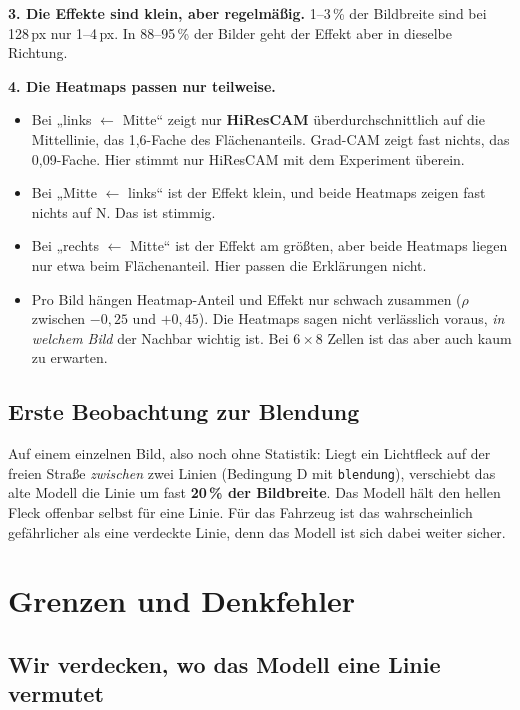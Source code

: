 \documentclass[11pt,a4paper]{article}
\newcommand{\code}[1]{\texttt{#1}}
\begin{document}
\textbf{3. Die Effekte sind klein, aber regelmäßig.} 1--3\,\% der Bildbreite sind bei 128\,px
nur 1--4\,px. In 88--95\,\% der Bilder geht der Effekt aber in dieselbe Richtung.

\textbf{4. Die Heatmaps passen nur teilweise.}
\begin{itemize}
  \item Bei „links $\leftarrow$ Mitte“ zeigt nur \textbf{HiResCAM} überdurchschnittlich auf die
        Mittellinie, das 1,6-Fache des Flächenanteils. Grad-CAM zeigt fast nichts, das
        0,09-Fache. Hier stimmt nur HiResCAM mit dem Experiment überein.
  \item Bei „Mitte $\leftarrow$ links“ ist der Effekt klein, und beide Heatmaps zeigen fast nichts
        auf N. Das ist stimmig.
  \item Bei „rechts $\leftarrow$ Mitte“ ist der Effekt am größten, aber beide Heatmaps liegen nur
        etwa beim Flächenanteil. Hier passen die Erklärungen nicht.
  \item Pro Bild hängen Heatmap-Anteil und Effekt nur schwach zusammen ($\rho$ zwischen $-0{,}25$
        und $+0{,}45$). Die Heatmaps sagen nicht verlässlich voraus, \emph{in welchem Bild} der
        Nachbar wichtig ist. Bei $6\times8$ Zellen ist das aber auch kaum zu erwarten.
\end{itemize}



\subsection{Erste Beobachtung zur Blendung}

Auf einem einzelnen Bild, also noch ohne Statistik: Liegt ein Lichtfleck auf der freien Straße
\emph{zwischen} zwei Linien (Bedingung D mit \code{blendung}), verschiebt das alte Modell die
Linie um fast \textbf{20\,\% der Bildbreite}. Das Modell hält den hellen Fleck offenbar selbst
für eine Linie. Für das Fahrzeug ist das wahrscheinlich gefährlicher als eine verdeckte Linie,
denn das Modell ist sich dabei weiter sicher.

\section{Grenzen und Denkfehler}

\subsection{Wir verdecken, wo das Modell eine Linie vermutet}
\end{document}
